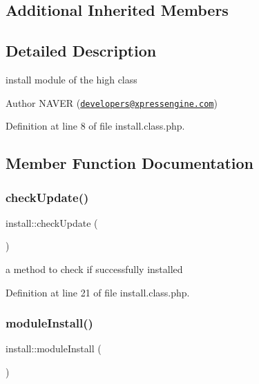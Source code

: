 \subsection*{Additional Inherited Members}


\subsection{Detailed Description}
install module of the high class 

\begin{DoxyAuthor}{Author}
N\+A\+V\+ER (\href{mailto:developers@xpressengine.com}{\tt developers@xpressengine.\+com}) 
\end{DoxyAuthor}


Definition at line 8 of file install.\+class.\+php.



\subsection{Member Function Documentation}
\hypertarget{classinstall_a45dc7f6b5268beeb21aa3bafa70b5b55}{}\label{classinstall_a45dc7f6b5268beeb21aa3bafa70b5b55} 
\subsubsection{\texorpdfstring{check\+Update()}{checkUpdate()}}
{\footnotesize\ttfamily install\+::check\+Update (\begin{DoxyParamCaption}{ }\end{DoxyParamCaption})}



a method to check if successfully installed 



Definition at line 21 of file install.\+class.\+php.

\hypertarget{classinstall_a4fee6fc0a704c9b0789d894f6243fd8d}{}\label{classinstall_a4fee6fc0a704c9b0789d894f6243fd8d} 
\subsubsection{\texorpdfstring{module\+Install()}{moduleInstall()}}
{\footnotesize\ttfamily install\+::module\+Install (\begin{DoxyParamCaption}{ }\end{DoxyParamCaption})}



